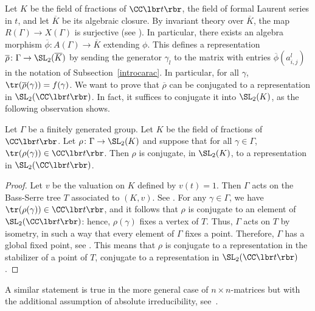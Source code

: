 Let $K$ be the field of fractions of $\CC\lbr t\rbr$, \ie 
the field of formal
Laurent series in $t$, and let $\overline{K}$ be its algebraic closure.
By invariant theory over $\overline{K}$, the map $R(\Gamma)\to X(\Gamma)$
is surjective (see \eg \cite[Th.\,5.9]{Mukai}).
In particular, there exists
an algebra morphism $\overline{\phi}\colon A(\Gamma)\to\overline{K}$
extending $\phi$. This defines a representation
$\overline{\rho}\colon\Gamma\to\SL_2(\overline{K})$ by sending the generator
$\gamma_l$ to the matrix with entries $\overline{\phi}(a^l_{i,j})$ in the
notation of Subsection~\ref{introcarac}. In particular, for all $\gamma$,
$\tr(\overline{\rho}(\gamma))=f(\gamma)$. We want to prove that
$\overline{\rho}$ can be conjugated to a representation in $\SL_2(\CC\lbr t\rbr)$.
In fact, it suffices to conjugate it into $\SL_2(K)$, as the following
observation shows.
\begin{lemma}\label{lem:TousEnsemble}
Let $\Gamma$ be a finitely generated group. Let $K$ be the field of
fractions of $\CC\lbr t\rbr$. Let $\rho\colon\Gamma\to\SL_2(K)$ and suppose that
for all $\gamma\in\Gamma$, $\tr(\rho(\gamma))\in\CC\lbr t\rbr$. Then $\rho$ is
conjugate, in $\SL_2(K)$, to a representation in $\SL_2(\CC\lbr t\rbr)$.
\end{lemma}
\begin{proof}
Let $v$ be the valuation on $K$ defined by $v(t)=1$. Then $\Gamma$ acts on
the Bass-Serre tree $T$ associated to $(K,v)$.
See \eg \cite[Chap.\,2]{Serre}.
For any $\gamma\in\Gamma$, we have $\tr(\rho(\gamma))\in\CC\lbr t\rbr$, and
it follows that $\rho$ is conjugate to an element of $\SL_2(\CC\lbr t\rbr)$:
hence, $\rho(\gamma)$ fixes a vertex of $T$.
Thus, $\Gamma$ acts on $T$ by isometry, in such a way that every element
of $\Gamma$ fixes a point. Therefore, $\Gamma$ has a global fixed point,
see \eg \cite[Chap.\,I.6.5, Cor.\,3]{Serre}.
This means that $\rho$ is conjugate to a representation in the stabilizer
of a point of $T$, \ie 
conjugate to a representation in $\SL_2(\CC\lbr t\rbr)$.
\end{proof}
A similar statement is true in the more general case of $n\times n$-matrices
but with the additional assumption of absolute irreducibility,
see~\cite[Lem.\,1.4.3]{CullerShalen}.

